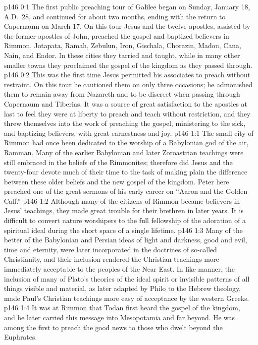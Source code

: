 \author{Midwayer Commission}
\vs p146 0:1 The first public preaching tour of Galilee began on Sunday, January 18, A.D.~28, and continued for about two months, ending with the return to Capernaum on March 17. On this tour Jesus and the twelve apostles, assisted by the former apostles of John, preached the gospel and baptized believers in Rimmon, Jotapata, Ramah, Zebulun, Iron, Gischala, Chorazin, Madon, Cana, Nain, and Endor. In these cities they tarried and taught, while in many other smaller towns they proclaimed the gospel of the kingdom as they passed through.
\vs p146 0:2 This was the first time Jesus permitted his associates to preach without restraint. On this tour he cautioned them on only three occasions; he admonished them to remain away from Nazareth and to be discreet when passing through Capernaum and Tiberias. It was a source of great satisfaction to the apostles at last to feel they were at liberty to preach and teach without restriction, and they threw themselves into the work of preaching the gospel, ministering to the sick, and baptizing believers, with great earnestness and joy.\plusone
{}
\vs p146 1:1 The small city of Rimmon had once been dedicated to the worship of a Babylonian god of the air, Ramman. Many of the earlier Babylonian and later Zoroastrian teachings were still embraced in the beliefs of the Rimmonites; therefore did Jesus and the twenty\hyp{}four devote much of their time to the task of making plain the difference between these older beliefs and the new gospel of the kingdom. Peter here preached one of the great sermons of his early career on “Aaron and the Golden Calf.”\plusone
\vs p146 1:2 Although many of the citizens of Rimmon became believers in Jesus’ teachings, they made great trouble for their brethren in later years. It is difficult to convert nature worshipers to the full fellowship of the adoration of a spiritual ideal during the short space of a single lifetime.
\pc \vs p146 1:3 Many of the better of the Babylonian and Persian ideas of light and darkness, good and evil, time and eternity, were later incorporated in the doctrines of so\hyp{}called Christianity, and their inclusion rendered the Christian teachings more immediately acceptable to the peoples of the Near East. In like manner, the inclusion of many of Plato’s theories of the ideal spirit or invisible patterns of all things visible and material, as later adapted by Philo to the Hebrew theology, made Paul’s Christian teachings more easy of acceptance by the western Greeks.
\pc \vs p146 1:4 It was at Rimmon that Todan first heard the gospel of the kingdom, and he later carried this message into Mesopotamia and far beyond. He was among the first to preach the good news to those who dwelt beyond the Euphrates.
